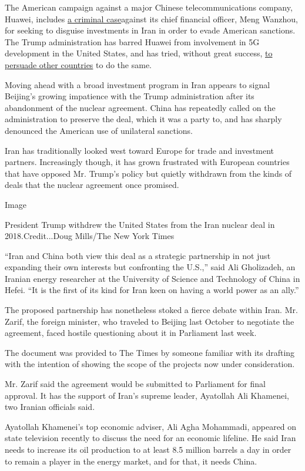 The American campaign against a major Chinese telecommunications
company, Huawei, includes
\href{https://www.nytimes.com/2019/01/28/us/politics/meng-wanzhou-huawei-iran.html}{a
criminal case}against its chief financial officer, Meng Wanzhou, for
seeking to disguise investments in Iran in order to evade American
sanctions. The Trump administration has barred Huawei from involvement
in 5G development in the United States, and has tried, without great
success,
\href{https://www.nytimes.com/2020/02/17/us/politics/us-huawei-5g.html}{to
persuade other countries} to do the same.

Moving ahead with a broad investment program in Iran appears to signal
Beijing's growing impatience with the Trump administration after its
abandonment of the nuclear agreement. China has repeatedly called on the
administration to preserve the deal, which it was a party to, and has
sharply denounced the American use of unilateral sanctions.

Iran has traditionally looked west toward Europe for trade and
investment partners. Increasingly though, it has grown frustrated with
European countries that have opposed Mr. Trump's policy but quietly
withdrawn from the kinds of deals that the nuclear agreement once
promised.

Image

President Trump withdrew the United States from the Iran nuclear deal in
2018.Credit...Doug Mills/The New York Times

``Iran and China both view this deal as a strategic partnership in not
just expanding their own interests but confronting the U.S.,'' said Ali
Gholizadeh, an Iranian energy researcher at the University of Science
and Technology of China in Hefei. ``It is the first of its kind for Iran
keen on having a world power as an ally.''

The proposed partnership has nonetheless stoked a fierce debate within
Iran. Mr. Zarif, the foreign minister, who traveled to Beijing last
October to negotiate the agreement, faced hostile questioning about it
in Parliament last week.

The document was provided to The Times by someone familiar with its
drafting with the intention of showing the scope of the projects now
under consideration.

Mr. Zarif said the agreement would be submitted to Parliament for final
approval. It has the support of Iran's supreme leader, Ayatollah Ali
Khamenei, two Iranian officials said.

Ayatollah Khamenei's top economic adviser, Ali Agha Mohammadi, appeared
on state television recently to discuss the need for an economic
lifeline. He said Iran needs to increase its oil production to at least
8.5 million barrels a day in order to remain a player in the energy
market, and for that, it needs China.

